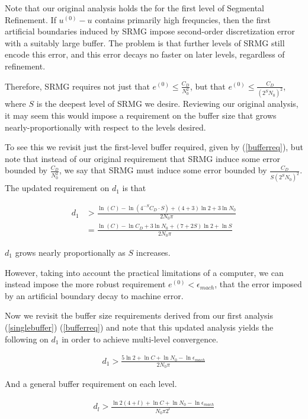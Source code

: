 \documentclass[final]{siamart1116}
\numberwithin{theorem}{section}
\begin{document}
Note that our original analysis holds the for the first level of Segmental Refinement. If $u^{(0)} - u$ contains primarily high frequncies, then the first artificial boundaries induced by SRMG impose second-order discretization error with a suitably large buffer. The problem is that further levels of SRMG still encode this error, and this error decays no faster on later levels, regardless of refinement. 

Therefore, SRMG requires not just that $e^{(0)} \leq \frac{C_D}{N_0^2}$, but that $e^{(0)} \leq \frac{C_D}{(2^{S} N_0)^2 }$, where $S$ is the deepest level of SRMG we desire. Reviewing our original analysis, it may seem this would impose a requirement on the buffer size that grows nearly-proportionally with respect to the levels desired. 

To see this we revisit just the first-level buffer required, given by (\ref{bufferreq}), but note that instead of our original requirement that SRMG induce some error bounded by $\frac{C_D}{N_0^2}$, we say that SRMG must induce some error bounded by $\frac{C_D}{S (2^S N_0)^2}$. The updated requirement on $d_1$ is that 

\begin{align*}
d_1 &> \frac{\ln(C) - \ln{(4^{-S} C_D \cdot S) } +(4+3)\ln2 + 3\ln{N_0} }{2 N_0 \pi}\\
  & = \frac{\ln(C)- \ln{C_D } + 3\ln{N_0}+ (7+2S)\ln2 + \ln{S} }{2 N_0 \pi} 
\end{align*}

$d_1$ grows nearly proportionally as $S$ increases. 

However, taking into account the practical limitations of a computer, we can instead impose the more robust requirement $e^{(0)} < \epsilon_{mach}$, that the error imposed by an artificial boundary decay to machine error. 

Now we revisit the buffer size requirements derived from our first analysis (\ref{singlebuffer}) (\ref{bufferreq}) and note that this updated analysis yields the following  on $d_1$ in order to achieve multi-level convergence.

\begin{align*}
d_1 > \frac{ 5\ln{2} + \ln{C} + \ln{N_0} - \ln{ \epsilon_{mach} }  }{2 N_0 \pi }
\end{align*}

And a general buffer requirement on each level. 

\begin{align*}
d_l > \frac{\ln{2}(4+l) + \ln{C} + \ln{N_0} -\ln{\epsilon_{mach}} }{N_0 \pi 2^l} 
\end{align*}
\end{document}
